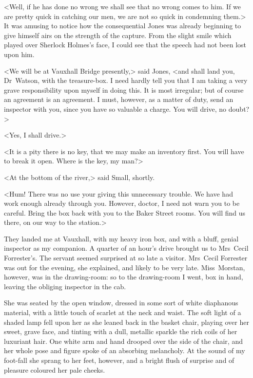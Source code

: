 <Well, if he has done no wrong we shall see that no wrong comes to him. If we are pretty quick in catching our men, we are not so quick in condemning them.> It was amusing to notice how the consequential Jones was already beginning to give himself airs on the strength of the capture. From the slight smile which played over Sherlock Holmes's face, I could see that the speech had not been lost upon him.

<We will be at Vauxhall Bridge presently,> said Jones, <and shall land you, Dr~Watson, with the treasure-box. I need hardly tell you that I am taking a very grave responsibility upon myself in doing this. It is most irregular; but of course an agreement is an agreement. I must, however, as a matter of duty, send an inspector with you, since you have so valuable a charge. You will drive, no doubt?>

<Yes, I shall drive.>

<It is a pity there is no key, that we may make an inventory first. You will have to break it open. Where is the key, my man?>

<At the bottom of the river,> said Small, shortly.

<Hum! There was no use your giving this unnecessary trouble. We have had work enough already through you. However, doctor, I need not warn you to be careful. Bring the box back with you to the Baker Street rooms. You will find us there, on our way to the station.>

They landed me at Vauxhall, with my heavy iron box, and with a bluff, genial inspector as my companion. A quarter of an hour's drive brought us to Mrs~Cecil Forrester's. The servant seemed surprised at so late a visitor. Mrs~Cecil Forrester was out for the evening, she explained, and likely to be very late. Miss~Morstan, however, was in the drawing-room: so to the drawing-room I went, box in hand, leaving the obliging inspector in the cab.

She was seated by the open window, dressed in some sort of white diaphanous material, with a little touch of scarlet at the neck and waist. The soft light of a shaded lamp fell upon her as she leaned back in the basket chair, playing over her sweet, grave face, and tinting with a dull, metallic sparkle the rich coils of her luxuriant hair. One white arm and hand drooped over the side of the chair, and her whole pose and figure spoke of an absorbing melancholy. At the sound of my foot-fall she sprang to her feet, however, and a bright flush of surprise and of pleasure coloured her pale cheeks.

